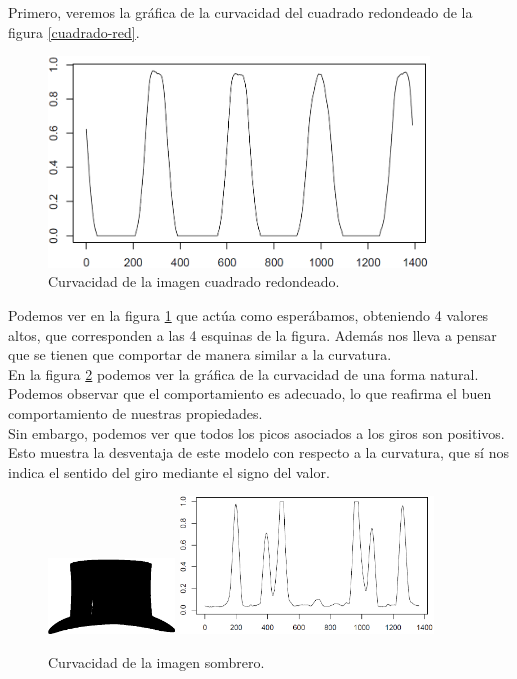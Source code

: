Primero, veremos la gráfica de la curvacidad del cuadrado redondeado de la figura \ref{cuadrado-red}.

\begin{figure}[H]
\begin{center}
\includegraphics[width=0.9\textwidth]{img/nolin-dev3-1-limpio-0815.png}
\end{center}

\caption{Curvacidad de la imagen cuadrado redondeado.}
\label{fig9}
\end{figure}

Podemos ver en la figura \ref{fig9} que actúa como esperábamos, obteniendo 4 valores altos, que corresponden a las 4 esquinas de la figura. Además nos lleva a pensar que se tienen que comportar de manera similar a la curvatura.\\

En la figura \ref{fig10} podemos ver la gráfica de la curvacidad de una forma natural. Podemos observar que el comportamiento es adecuado, lo que reafirma el buen comportamiento de nuestras propiedades.\\

Sin embargo, podemos ver que todos los picos asociados a los giros son positivos. Esto muestra la desventaja de este modelo con respecto a la curvatura, que sí nos indica el sentido del giro mediante el signo del valor.\\

\begin{figure}[H]
\begin{center}

\includegraphics[width=0.3\textwidth]{img/hat-7.png} \hfill \includegraphics[width=0.6\textwidth]{img/nolin-hat-7.png}
\end{center}

\caption{Curvacidad de la imagen sombrero.}
\label{fig10}
\end{figure}



